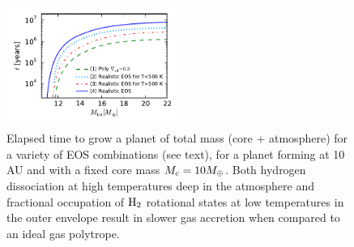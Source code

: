 \documentclass[apj]{emulateapj}
\begin{document}


\begin{figure}[h]
\centering
\includegraphics[width=0.5\textwidth]{../../figs/ModelAtmospheres/RadSelfGravRealEOS/PaperFigs/tplot.pdf}
\caption{Elapsed time to grow a planet of total mass (core + atmosphere) for a variety of EOS combinations (see text), for a planet forming at 10 AU and with a fixed core mass $M_{\rm c}=10 M_{\oplus}$. Both hydrogen dissociation at high temperatures deep in the atmosphere and fractional occupation of $\rm H_2$ rotational states at low temperatures in the outer envelope result in slower gas accretion when compared to an ideal gas polytrope.}
\label{fig:tplotall}
\end{figure}
\end{document}
